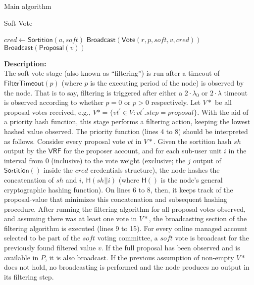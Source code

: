 \documentclass[10pt,a4paper]{article}
\begin{document}
\begin{section}{Main algorithm}
\begin{subsection}{Soft Vote}
\begin{algorithm}[H]
\begin{algorithmic}[1]
            \State $cred \gets \mathsf{Sortition}(a, soft)$
                \State $\mathsf{Broadcast}(\mathsf{Vote}(r, p, soft, v, cred))$
                    \State $\mathsf{Broadcast}(\mathsf{Proposal}(v))$
                \EndIf
            \EndIf
        \EndFor
    \EndIf

    \EndFunction
    \end{algorithmic}
\end{algorithm}

\noindent \textbf{Description:}\\
The soft vote stage (also known as ``filtering'') is run after a timeout of $\mathsf{FilterTimeout}(p)$
(where $p$ is the executing period of the node) is observed by the node. 
That is to say, filtering is triggered after either a $2\cdot\lambda_0$ or $2\cdot\lambda$ timeout is observed according 
to whether $p=0$ or $p>0$ respectively.
Let $V*$ be all proposal votes received, e.g., $V*=\{vt^\prime\in V : vt^\prime.step = proposal\}$.
With the aid of a priority hash function, this stage performs a filtering action,
keeping the lowest hashed value observed.
The priority function (lines 4 to 8) should be interpreted as follows. Consider every proposal vote $vt$ in $V*$.
Given the sortition hash $sh$ output by the $\mathsf{VRF}$ for the proposer account, and for each sub-user unit $i$ 
in the interval from $0$ (inclusive) to the vote weight (exclusive; the $j$ output of $\mathsf{Sortition}()$ inside 
the $cred$ credentials structure), the node hashes the concatenation of $sh$ and $i$, $\mathsf{H}(sh||i)$ 
(where $\mathsf{H}()$ is the node's general cryptographic hashing function). On lines 6 to 8, 
then, it keeps track of the proposal-value that minimizes this concatenation and subsequent hashing procedure.
After running the filtering algorithm for all proposal votes observed, and assuming there was at least one vote
in $V*$, the broadcasting section of the filtering algorithm is executed (lines 9 to 15).
For every online managed account selected to be part of the $soft$ voting committee, a $soft$ vote is
broadcast for the previously found filtered value $v$. If the full proposal has been observed and is available in $P$,
it is also broadcast. 
If the previous assumption of non-empty $V*$ does not hold, no broadcasting is performed and the node produces no
output in its filtering step.

\end{subsection}


\end{section}
\end{document}

